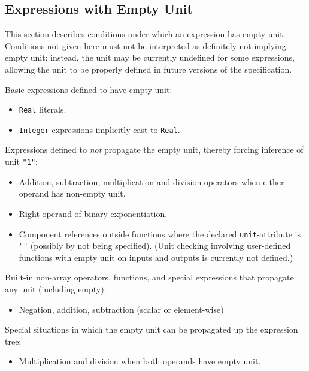 \subsection{Expressions with Empty Unit}\label{expressions-with-empty-unit}

This section describes conditions under which an expression has empty unit.
Conditions not given here must not be interpreted as definitely not implying empty unit; instead, the unit may be currently undefined for some expressions, allowing the unit to be properly defined in future versions of the specification.

Basic expressions defined to have empty unit:
\begin{itemize}
\item
  \lstinline!Real! literals.
\item
  \lstinline!Integer! expressions implicitly cast to \lstinline!Real!.
\end{itemize}

Expressions defined to \emph{not} propagate the empty unit, thereby forcing inference of unit \lstinline!"1"!:
\begin{itemize}
\item
  Addition, subtraction, multiplication and division operators when either operand has non-empty unit.
\item
  Right operand of binary exponentiation.
\item
  Component references outside functions where the declared \lstinline!unit!-attribute is \lstinline!""! (possibly by not being specified).
  (Unit checking involving user-defined functions with empty unit on inputs and outputs is currently not defined.)
\end{itemize}

Built-in non-array operators, functions, and special expressions that propagate any unit (including empty):
\begin{itemize}
\item
  Negation, addition, subtraction (scalar or element-wise)
\end{itemize}

Special situations in which the empty unit can be propagated up the expression tree:
\begin{itemize}
\item
  Multiplication and division when both operands have empty unit.
\end{itemize}

